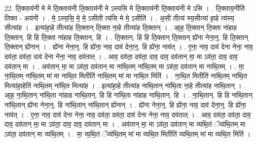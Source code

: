 \documentclass[17pt]{extarticle}
\begin{document}
22. ति॒क्ताय॑नी मे मे ति॒क्ताय॑नी ति॒क्ताय॑नी मे ऽस्यसि मे ति॒क्ताय॑नी ति॒क्ताय॑नी मे ऽसि । . ति॒क्ताय॒नीति॑ तिक्त - अय॑नी । . मे॒ ऽस्य॒सि॒ मे॒ मे॒ ऽसीती त्य॑सि मे मे॒ ऽसीति॑ । . अ॒सी तीत्य॑ स्य॒सीत्या॑ हा॒हे त्य॑स्य॒ सीत्या॑ह । . इत्या॑हा॒हे तीत्या॑ह ति॒क्तान् ति॒क्ता ना॒हे तीत्या॑ह ति॒क्तान् । . आ॒ह॒ ति॒क्तान् ति॒क्ता ना॑हाह ति॒क्तान्. हि हि ति॒क्ता ना॑हाह ति॒क्तान्. हि । . ति॒क्तान्. हि हि ति॒क्तान् ति॒क्तान् ह्ये॑ना नेना॒न्॒. हि ति॒क्तान् ति॒क्तान् ह्ये॑नान् । . ह्ये॑ना नेना॒न्॒. हि ह्ये॑ना॒ नाव॒ दाव॑ देना॒न्॒. हि ह्ये॑ना॒ नाव॑त् । . ए॒ना॒ नाव॒ दाव॑ देना नेना॒ नाव॒ दव॑ता॒ दव॑ता॒ दाव॑ देना नेना॒ नाव॒ दव॑तात् । . आव॒ दव॑ता॒ दव॑ता॒ दाव॒ दाव॒ दव॑तान् मा॒ मा ऽव॑ता॒ दाव॒ दाव॒ दव॑तान् मा । . अव॑तान् मा॒ मा ऽव॑ता॒ दव॑तान् मा नाथि॒तम् ना॑थि॒तम् मा ऽव॑ता॒ दव॑तान् मा नाथि॒तम् । . मा॒ ना॒थि॒तम् ना॑थि॒तम् मा॑ मा नाथि॒त मितीति॑ नाथि॒तम् मा॑ मा नाथि॒त मिति॑ । . ना॒थि॒त मितीति॑ नाथि॒तम् ना॑थि॒त मित्या॑हा॒हेति॑ नाथि॒तम् ना॑थि॒त मित्या॑ह । . इत्या॑हा॒हे तीत्या॑ह नाथि॒तान् ना॑थि॒ता ना॒हे तीत्या॑ह नाथि॒तान् । . आ॒ह॒ ना॒थि॒तान् ना॑थि॒ता ना॑हाह नाथि॒तान्. हि हि ना॑थि॒ता ना॑हाह नाथि॒तान्. हि । . ना॒थि॒तान्. हि हि ना॑थि॒तान् ना॑थि॒तान् ह्ये॑ना नेना॒न्॒. हि ना॑थि॒तान् ना॑थि॒तान् ह्ये॑नान् । . ह्ये॑ना नेना॒न्॒. हि ह्ये॑ना॒ नाव॒ दाव॑ देना॒न्॒. हि ह्ये॑ना॒ नाव॑त् । . ए॒ना॒ नाव॒ दाव॑ देना नेना॒ नाव॒ दव॑ता॒ दव॑ता॒ दाव॑ देना नेना॒ नाव॒ दव॑तात् । . आव॒ दव॑ता॒ दव॑ता॒ दाव॒ दाव॒ दव॑तान् मा॒ मा ऽव॑ता॒ दाव॒ दाव॒ दव॑तान् मा । . अव॑तान् मा॒ मा ऽव॑ता॒ दव॑तान् मा व्यथि॒तं ॅव्य॑थि॒तम् मा ऽव॑ता॒ दव॑तान् मा व्यथि॒तम् । . मा॒ व्य॒थि॒तं ॅव्य॑थि॒तम् मा॑ मा व्यथि॒त मितीति॑ व्यथि॒तम् मा॑ मा व्यथि॒त मिति॑ । \newline
\end{document}
